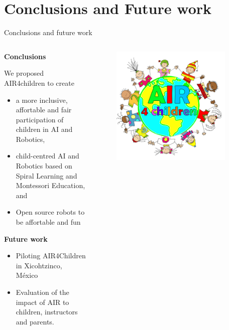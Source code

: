 \section{Conclusions and Future work}

{
\begin{frame}{Conclusions and future work}

  \begin{columns}
  \begin{column}{.75\linewidth}

  \textbf{Conclusions}   

  We proposed AIR4children to create
  \begin{itemize}
    \item a more inclusive, affortable and fair participation of children in AI and Robotics,
    \item child-centred AI and Robotics based on Spiral Learning and Montessori Education, and
    \item Open source robots to be affortable and fun 
  \end{itemize}

  \textbf{Future work}
  \begin{itemize}
    \item Piloting AIR4Children in Xicohtzinco, M\'exico
    \item Evaluation of the impact of AIR to children, instructors and parents. %
  \end{itemize}

    \end{column}


  \begin{column}{.3\linewidth}

      \begin{figure}
        \centering
        \includegraphics[width=0.9\textwidth]{./figures/logo/outputs/drawing-v00.png}
      \end{figure}


\end{column}
\end{columns}
\end{frame}}
